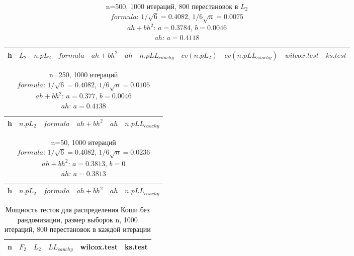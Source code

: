 \documentclass{report}
\begin{document}
\begin{longtable}{|c|c|c|c|c|c|c|c|c|c|c|}
  \caption{n=500, 1000 итераций, 800 перестановок в $L_2$ \\
  $formula$: $1/\sqrt{6}=0.4082$, $1/6\sqrt{n}=0.0075$ \\
  $ah+bh^2$: $a=0.3784$, $b=0.0046$ \\
  $ah$: $a=0.4118$} \\
  \hline
  h & $L_2$ & $n.pL_2$ & $formula$ & $ah+bh^2$ & $ah$ & $n.pLL_{cauchy}$ & $cv(n.pL_2)$ & $cv(n.pLL_{cauchy})$ & $wilcox.test$ & $ks.test$ \\ \hline
  
  \hline
\end{longtable}

\begin{longtable}{|c|c|c|c|c|c|}
  \caption{n=250, 1000 итераций \\
  $formula$: $1/\sqrt{6}=0.4082$, $1/6\sqrt{n}=0.0105$ \\
  $ah+bh^2$: $a=0.377$, $b=0.0046$ \\
  $ah$: $a=0.4138$} \\
  \hline
  h & $n.pL_2$ & $formula$ & $ah+bh^2$ & $ah$ & $n.pLL_{cauchy}$ \\ \hline
  
  \hline
\end{longtable}

\begin{longtable}{|c|c|c|c|c|c|}
  \caption{n=50, 1000 итераций \\
  $formula$: $1/\sqrt{6}=0.4082$, $1/6\sqrt{n}=0.0236$ \\
  $ah+bh^2$: $a=0.3813$, $b=0$ \\
  $ah$: $a=0.3813$} \\
  \hline
  h & $n.pL_2$ & $formula$ & $ah+bh^2$ & $ah$ & $n.pLL_{cauchy}$ \\ \hline
  
  \hline
\end{longtable}

\begin{longtable}{|c|c|c|c|c|c|}
  \caption{Мощность тестов для распределения Коши без рандомизации, размер выборок n, 1000 итераций, 800 перестановок в каждой итерации} \\
  \hline
  n & $F_2$ & $L_{2}$ & $LL_{cauchy}$ & wilcox.test & ks.test \\ \hline
  
  \hline
\end{longtable}
\end{document}
